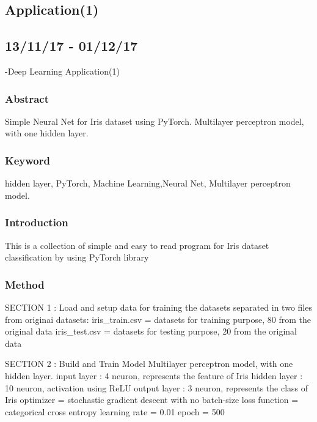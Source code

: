 \documentclass{article}
\begin{document}
\begin{CJK}{UTF8}{}
\section{Application(1)}
\subsection{13/11/17 - 01/12/17}
-Deep Learning Application(1)\newline\newline
\subsubsection{Abstract}
Simple Neural Net for Iris dataset using PyTorch. Multilayer perceptron model, with one hidden layer.
\subsubsection{Keyword}
hidden layer, PyTorch, Machine Learning,Neural Net, Multilayer perceptron model.

\subsubsection{Introduction}
This is a collection of simple and easy to read program for Iris dataset classification by using PyTorch library 

\subsubsection{Method}

  SECTION 1 : Load and setup data for training\newline\newline
  the datasets separated in two files from originai datasets:\newline
  iris_train.csv = datasets for training purpose, 80 from the original data\newline
  iris_test.csv  = datasets for testing purpose, 20 from the original data\newline
  
  SECTION 2 : Build and Train Model\newline\newline
  Multilayer perceptron model, with one hidden layer.\newline
  input layer : 4 neuron, represents the feature of Iris\newline
  hidden layer : 10 neuron, activation using ReLU\newline
  output layer : 3 neuron, represents the class of Iris\newline\newline
  optimizer = stochastic gradient descent with no batch-size\newline
  loss function = categorical cross entropy\newline
  learning rate = 0.01\newline
  epoch = 500\newline
  

\end{CJK}
\end{document}
